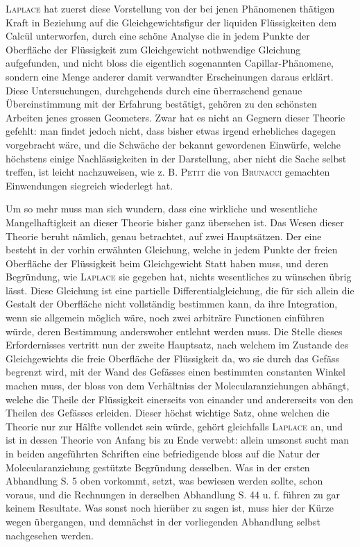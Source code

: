 \textsc{Laplace} hat zuerst diese Vorstellung von der bei jenen Phänomenen thätigen
Kraft in Beziehung auf die Gleichgewichtsfigur der liquiden Flüssigkeiten dem
Calcül unterworfen, durch eine schöne Analyse die in jedem Punkte der Oberfläche
der Flüssigkeit zum Gleichgewicht nothwendige Gleichung aufgefunden, und nicht
bloss die eigentlich sogenannten Capillar-Phänomene, sondern eine Menge anderer
damit verwandter Erscheinungen daraus erklärt. Diese Untersuchungen, durchgehends
durch eine überraschend genaue Übereinstimmung mit der Erfahrung bestätigt,
gehören zu den schönsten Arbeiten jenes grossen Geometers. Zwar hat es nicht an
Gegnern dieser Theorie gefehlt: man findet jedoch nicht, dass bisher etwas irgend
erhebliches dagegen vorgebracht wäre, und die Schwäche der bekannt gewordenen
Einwürfe, welche höchstens einige Nachlässigkeiten in der Darstellung, aber nicht
die Sache selbst treffen, ist leicht nachzuweisen, wie z. B. \textsc{Petit} die von
\textsc{Brunacci} gemachten Einwendungen siegreich wiederlegt hat.

Um so mehr muss man sich wundern, dass eine wirkliche und wesentliche
Mangelhaftigkeit an dieser Theorie bisher ganz übersehen ist. Das Wesen dieser
Theorie beruht nämlich, genau betrachtet, auf zwei Hauptsätzen. Der eine besteht
in der vorhin erwähnten Gleichung, welche in jedem Punkte der freien Oberfläche
der Flüssigkeit beim Gleichgewicht Statt haben muss, und deren Begründung, wie
\textsc{Laplace} sie gegeben hat, nichts wesentliches zu wünschen übrig lässt.
Diese Gleichung ist eine partielle Differentialgleichung, die für sich allein die
Gestalt der Oberfläche nicht vollständig bestimmen kann, da ihre Integration,
wenn sie allgemein möglich wäre, noch zwei arbiträre Functionen einführen würde,
\clearpage
{}
\noindent
deren Bestimmung anderswoher entlehnt werden muss. Die Stelle dieses Erfordernisses
vertritt nun der zweite Hauptsatz, nach welchem im Zustande des Gleichgewichts
die freie Oberfläche der Flüssigkeit da, wo sie durch das Gefäss begrenzt wird,
mit der Wand des Gefässes einen bestimmten constanten Winkel machen muss, der
bloss von dem Verhältniss der Molecularanziehungen abhängt, welche die Theile der
Flüssigkeit einerseits von einander und andererseits von den Theilen des Gefässes
erleiden. Dieser höchst wichtige Satz, ohne welchen die Theorie nur zur Hälfte
vollendet sein würde, gehört gleichfalls \textsc{Laplace} an, und ist in dessen
Theorie von Anfang bis zu Ende verwebt: allein umsonst sucht man in beiden
angeführten Schriften eine befriedigende bloss auf die Natur der Molecularanziehung
gestützte Begründung desselben. Was in der ersten Abhandlung S. 5 oben vorkommt,
setzt, was bewiesen werden sollte, schon voraus, und die Rechnungen in derselben
Abhandlung S. 44 u. f. führen zu gar keinem Resultate. Was sonst noch hierüber zu
sagen ist, muss hier der Kürze wegen übergangen, und demnächst in der vorliegenden
Abhandlung selbst nachgesehen werden.

